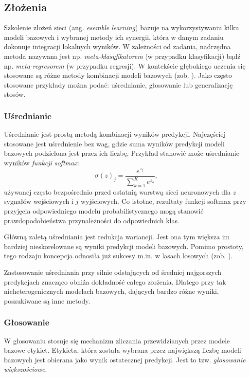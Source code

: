 \subsection{Złożenia}
Szkolenie złożeń sieci (ang. \textit{esemble learning}) bazuje na wykorzystywaniu kilku modeli bazowych i wybranej metody ich synergii, która w danym zadaniu dokonuje integracji lokalnych wyników. W zależności od zadania, nadrzędna metoda nazywana jest np. \textit{meta-klasyfikatorem} (w przypadku klasyfikacji) bądź np. \textit{meta-regresorem} (w przypadku regresji). W kontekście głębokiego uczenia się stosowane są różne metody kombinacji modeli bazowych (zob. \cite{Ensemble}). Jako często stosowane przykłady można podać: uśrednianie, głosowanie lub generalizację stosów.

\subsubsection{Uśrednianie}
Uśrednianie jest prostą metodą kombinacji wyników predykcji. Najczęściej stosowane jest uśrednienie bez wag, gdzie suma wyników predykcji modeli bazowych podzielona jest przez ich liczbę. Przykład stanowić może uśrednianie wyników \textit{funkcji softmax}:
\begin{equation}
\sigma (z)_j= \frac{e^{z_j}}{\sum_{k=1}^{K} e^{z_k}},
\end{equation} 
używanej często bezpośrednio przed ostatnią warstwą sieci neuronowych dla $z$ sygnałów wejściowych i $j$ wyjściowych. Co istotne, rezultaty funkcji softmax przy przyjęcia odpowiedniego modelu probabilistycznego mogą stanowić prawdopodobieństwa przynależności do odpowiednich klas.

Główną zaletą uśredniania jest redukcja wariancji. Jest ona tym większa \linebreak im bardziej nieskorelowane są wyniki predykcji modeli bazowych. Pomimo prostoty, tego rodzaju koncepcja odnosiła już sukcesy m.in. w lasach losowych (zob. \cite{Breiman2001}).

Zastosowanie uśredniania przy silnie odstających od średniej najgorszych predykcjach znacząco obniża dokładność całego złożenia. Dlatego przy tak nieheterogenicznych modelach bazowych, dających bardzo różne wyniki, poszukiwane są inne metody.

\subsubsection{Głosowanie}

W głosowaniu stosuje się mechanizm zliczania przewidzianych przez modele bazowe etykiet. Etykieta, która została wybrana przez największą liczbę modeli bazowych jest obierana jako wynik ostatecznej predykcji. Jest to tzw. \textit{głosowanie większościowe}.

